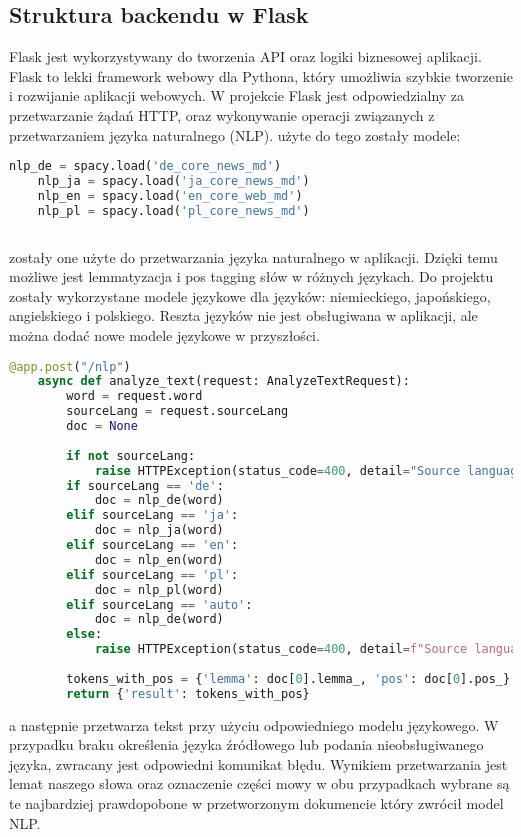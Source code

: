 \subsection{Struktura backendu w Flask}
Flask jest wykorzystywany do tworzenia API oraz logiki biznesowej aplikacji. Flask to lekki framework webowy dla Pythona, który umożliwia szybkie tworzenie i rozwijanie aplikacji webowych. W projekcie Flask jest odpowiedzialny za przetwarzanie żądań HTTP, oraz wykonywanie operacji związanych z przetwarzaniem języka naturalnego (NLP).
użyte do tego zostały modele:

\begin{lstlisting}[language=Python, caption=kod do importowania modeli NLP]
    nlp_de = spacy.load('de_core_news_md')
    nlp_ja = spacy.load('ja_core_news_md')
    nlp_en = spacy.load('en_core_web_md')
    nlp_pl = spacy.load('pl_core_news_md')
    
\end{lstlisting}

zostały one użyte do przetwarzania języka naturalnego w aplikacji. Dzięki temu możliwe jest lemmatyzacja i pos tagging słów w różnych językach. Do projektu zostały wykorzystane modele językowe dla języków: niemieckiego, japońskiego, angielskiego i polskiego. Reszta języków nie jest obsługiwana w aplikacji, ale można dodać nowe modele językowe w przyszłości.

\begin{lstlisting}[language=Python, caption=kod do obsługi lemmatyzacji i pos taggingu]
    @app.post("/nlp")
    async def analyze_text(request: AnalyzeTextRequest):
        word = request.word
        sourceLang = request.sourceLang
        doc = None
    
        if not sourceLang:
            raise HTTPException(status_code=400, detail="Source language is required")
        if sourceLang == 'de':
            doc = nlp_de(word)
        elif sourceLang == 'ja':
            doc = nlp_ja(word)
        elif sourceLang == 'en':
            doc = nlp_en(word)
        elif sourceLang == 'pl':
            doc = nlp_pl(word)
        elif sourceLang == 'auto':
            doc = nlp_de(word)
        else:
            raise HTTPException(status_code=400, detail=f"Source language is not currently used: {sourceLang}")
        
        tokens_with_pos = {'lemma': doc[0].lemma_, 'pos': doc[0].pos_}
        return {'result': tokens_with_pos}
\end{lstlisting}

a następnie przetwarza tekst przy użyciu odpowiedniego modelu językowego. W przypadku braku określenia języka źródłowego lub podania nieobsługiwanego języka, zwracany jest odpowiedni komunikat błędu.
Wynikiem przetwarzania jest lemat naszego słowa oraz oznaczenie części mowy w obu przypadkach wybrane są te najbardziej prawdopobone w przetworzonym dokumencie który zwrócił model NLP.


